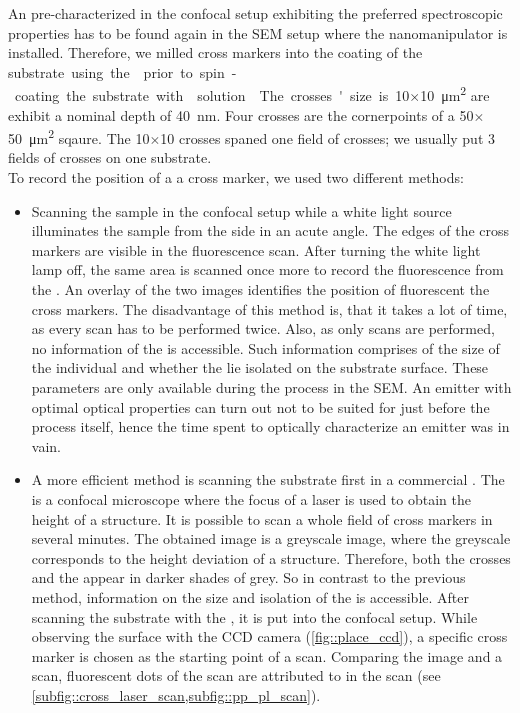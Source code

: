 	An \nd pre-characterized in the confocal setup exhibiting the preferred spectroscopic properties has to be found again in the SEM setup where the nanomanipulator is installed.
	Therefore, we milled cross markers into the \ir coating of the \si substrate using the \fib prior to spin-coating the substrate with \nd solution.
	The crosses' size is \num{10}$\times$\SI{10}{\micro\meter\squared} are exhibit a nominal depth of \SI{40}{nm}.
	Four crosses are the cornerpoints of a \num{50}$\times$\SI{50}{\micro\meter\squared} sqaure.
	The \num{10}$\times$\num{10} crosses spaned one field of crosses; we usually put 3 fields of crosses on one substrate.
	\\
	To record the position of a \nd \wrt a cross marker, we used two different methods:
	\begin{itemize}
		\item Scanning the sample in the confocal setup while a white light source illuminates the sample from the side in an acute angle. The edges of the cross markers are visible in the fluorescence scan. After turning the white light lamp off, the same area is scanned once more to record the fluorescence from the \sivs. An overlay of the two images identifies the position of fluorescent \sivs \wrt the cross markers. The disadvantage of this method is, that it takes a lot of time, as every scan has to be performed twice. Also, as only \fl scans are performed, no information of the \nds is accessible. Such information comprises of the size of the individual \nds and whether the \nds lie isolated on the substrate surface. These parameters are only available during the \pp process in the SEM. An emitter with optimal optical properties can turn out not to be suited for \pp just before the process itself, hence the time spent to optically characterize an emitter was in vain.
		\item A more efficient method is scanning the substrate first in a commercial \lsm {}. The \lsm is a confocal microscope where the focus of a laser is used to obtain the height of a structure. It is possible to scan a whole field of cross markers in several minutes. The obtained image is a greyscale image, where the greyscale corresponds to the height deviation of a structure. Therefore, both the crosses and the \nds appear in darker shades of grey. So in contrast to the previous method, information on the size and isolation of the \nds is accessible. After scanning the substrate with the \lsm, it is put into the confocal setup. While observing the surface with the CCD camera (\cref{fig::place_ccd}), a specific cross marker is chosen as the starting point of a \fl scan. Comparing the \lsm image and a \fl scan, fluorescent dots of the \fl scan are attributed to \nds in the \lsm scan (see \cref{subfig::cross_laser_scan,subfig::pp_pl_scan}).
	\end{itemize}

